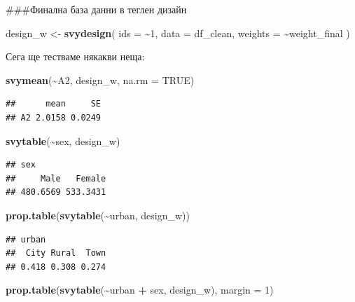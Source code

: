 \documentclass[
]{article}
\newenvironment{Shaded}{\begin{snugshade}}{\end{snugshade}}
\newcommand{\AttributeTok}[1]{\textcolor[rgb]{0.13,0.29,0.53}{#1}}
\newcommand{\ConstantTok}[1]{\textcolor[rgb]{0.56,0.35,0.01}{#1}}
\newcommand{\DecValTok}[1]{\textcolor[rgb]{0.00,0.00,0.81}{#1}}
\newcommand{\FunctionTok}[1]{\textcolor[rgb]{0.13,0.29,0.53}{\textbf{#1}}}
\newcommand{\NormalTok}[1]{#1}
\newcommand{\OtherTok}[1]{\textcolor[rgb]{0.56,0.35,0.01}{#1}}
\newcommand{\SpecialCharTok}[1]{\textcolor[rgb]{0.81,0.36,0.00}{\textbf{#1}}}
\begin{document}
\#\#\#Финална база данни в теглен дизайн

\begin{Shaded}
\begin{Highlighting}[]
\NormalTok{design\_w }\OtherTok{\textless{}{-}} \FunctionTok{svydesign}\NormalTok{(}
  \AttributeTok{ids =} \SpecialCharTok{\textasciitilde{}}\DecValTok{1}\NormalTok{,}
  \AttributeTok{data =}\NormalTok{ df\_clean,}
  \AttributeTok{weights =} \SpecialCharTok{\textasciitilde{}}\NormalTok{weight\_final}
\NormalTok{)}
\end{Highlighting}
\end{Shaded}

Сега ще тестваме някакви неща:

\begin{Shaded}
\begin{Highlighting}[]
\FunctionTok{svymean}\NormalTok{(}\SpecialCharTok{\textasciitilde{}}\NormalTok{A2, design\_w, }\AttributeTok{na.rm =} \ConstantTok{TRUE}\NormalTok{)}
\end{Highlighting}
\end{Shaded}

\begin{verbatim}
##      mean     SE
## A2 2.0158 0.0249
\end{verbatim}

\begin{Shaded}
\begin{Highlighting}[]
\FunctionTok{svytable}\NormalTok{(}\SpecialCharTok{\textasciitilde{}}\NormalTok{sex, design\_w)}
\end{Highlighting}
\end{Shaded}

\begin{verbatim}
## sex
##     Male   Female 
## 480.6569 533.3431
\end{verbatim}

\begin{Shaded}
\begin{Highlighting}[]
\FunctionTok{prop.table}\NormalTok{(}\FunctionTok{svytable}\NormalTok{(}\SpecialCharTok{\textasciitilde{}}\NormalTok{urban, design\_w))}
\end{Highlighting}
\end{Shaded}

\begin{verbatim}
## urban
##  City Rural  Town 
## 0.418 0.308 0.274
\end{verbatim}

\begin{Shaded}
\begin{Highlighting}[]
\FunctionTok{prop.table}\NormalTok{(}\FunctionTok{svytable}\NormalTok{(}\SpecialCharTok{\textasciitilde{}}\NormalTok{urban }\SpecialCharTok{+}\NormalTok{ sex, design\_w), }\AttributeTok{margin =} \DecValTok{1}\NormalTok{)}
\end{Highlighting}
\end{Shaded}
\end{document}
